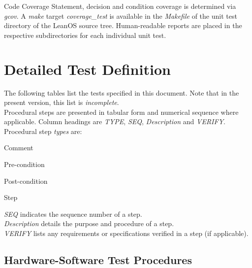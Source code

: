 {Code Coverage}{%
Statement, decision and condition coverage is determined via \emph{gcov}.
A \emph{make} target \emph{coverage\_test} is available in the \emph{Makefile}
of the unit test directory of the LeanOS source tree.
Human-readable reports are placed in the respective subdirectories for each
individual unit test.
}%
{}{}




\chapter{Detailed Test Definition}

The following tables list the tests specified in this document. Note that in
the present version, this list is \emph{incomplete}.\\

\noindent
Procedural steps are presented in tabular form and numerical sequence where
applicable. Column headings are \emph{TYPE}, \emph{SEQ}, \emph{Description}
and \emph{VERIFY}.\\

\noindent
Procedural step \emph{types} are:
\begin{description}[labelwidth=4em,leftmargin=\parindent,labelindent=\parindent]
	\item[\textbf{CMT}]	Comment
	\item[\textbf{PRE}]	Pre-condition
	\item[\textbf{PST}]	Post-condition
	\item[\textbf{STP}]	Step
\end{description}


\noindent
\emph{SEQ} indicates the sequence number of a step.\\

\noindent
\emph{Description} details the purpose and procedure of a step. \\

\noindent
\emph{VERIFY} lists any requirements or specifications verified in a 
step (if applicable).\\


\section{Hardware-Software Test Procedures}


